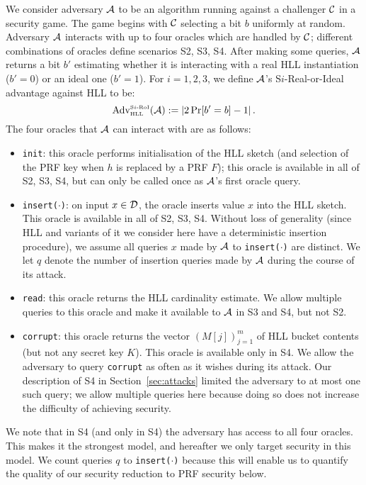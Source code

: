 \documentclass{article}
\begin{document}
We consider adversary ${\cal A}$ to be an algorithm running against a challenger ${\cal C}$ in a security game. The game begins with ${\cal C}$ selecting a bit $b$ uniformly at random. Adversary ${\cal A}$ interacts with up to four oracles which are handled by ${\cal C}$; different combinations of oracles define scenarios S2, S3, S4. After making some queries, ${\cal A}$ returns a bit $b'$ estimating whether it is interacting with a real HLL instantiation ($b'=0$) or an ideal one ($b'=1$). For $i=1, 2, 3$, we define ${\cal A}$'s S$i$-Real-or-Ideal advantage against HLL to be:
\[
\mbox{Adv}^{\mbox{\tiny S$i$-RoI}}_{\mbox{\tiny HLL}}({\cal A}) := \lvert 2\Pr[b' = b] - 1 \rvert \, .
\]
The four oracles that  ${\cal A}$ can interact with are as follows:
\begin{itemize}
\item \texttt{init}: this oracle performs initialisation of the HLL sketch (and selection of the PRF key when $h$ is replaced by a PRF $F$); this oracle is available in all of S2, S3, S4, but can only be called once as ${\cal A}$'s first oracle query.
\item \texttt{insert($\cdot$)}: on input $x \in {\cal D}$, the oracle inserts value $x$ into the HLL sketch. This oracle is available in all of S2, S3, S4. Without loss of generality (since HLL and variants of it we consider here have a deterministic insertion procedure), we assume all queries $x$ made by ${\cal A}$ to \texttt{insert($\cdot$)} are distinct. We let $q$ denote the number of insertion queries made by ${\cal A}$ during the course of its attack.
\item \texttt{read}: this oracle returns the HLL cardinality estimate. We allow multiple queries to this oracle and make it available to ${\cal A}$ in S3 and S4, but not S2.
\item \texttt{corrupt}: this oracle returns the vector $(M[j])_{j=1}^{m}$ of HLL bucket contents (but not any secret key $K$). This oracle is available only in S4. We allow the adversary to query \texttt{corrupt} as often as it wishes during its attack. Our description of S4 in Section~\ref{sec:attacks} limited the adversary to at most one such query; we allow multiple queries here because doing so does not increase the difficulty of achieving security.  
\end{itemize}

We note that in S4 (and only in S4) the adversary has access to all four oracles. This makes it the strongest model, and hereafter we only target security in this model. We count queries $q$ to \texttt{insert($\cdot$)} because this will enable us to quantify the quality of our security reduction to PRF security below.
\end{document}
